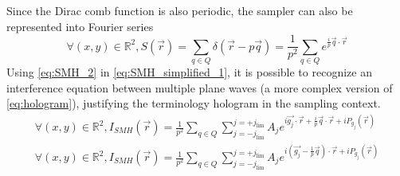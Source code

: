 \documentclass[12pt]{article}
\begin{document}
Since the Dirac comb function is also periodic, the sampler can also be represented into Fourier series
\begin{equation}
\forall (x,y) \in \mathbb{R}^{2}, S(\vec{r})=\sum_{q\in Q}\delta(\vec{r}-p\vec{q}) = \frac{1}{p^2}\sum_{q\in Q}e^{\frac{i}{p}\vec{q}\cdot\vec{r}}
\label{eq:SMH_2}
\end{equation}
Using \cref{eq:SMH_2} in \cref{eq:SMH_simplified_1}, it is possible to recognize an interference equation between multiple plane waves (a more complex version of \cref{eq:hologram}), justifying the terminology hologram in the sampling context.
\begin{equation}
\begin{gathered}
\forall (x,y) \in \mathbb{R}^{2}, I_{\mathit{SMH}}(\vec{r})=\frac{1}{p^2}\sum_{q\in Q}\sum_{j=-j_{\text{lim}}}^{j=+j_{\text{lim}}}A_je^{i\vec{g_j}\cdot\vec{r}+\frac{i}{p}\vec{q}\cdot\vec{r}+iP_{g_{j}}(\vec{r})} \\
\forall (x,y) \in \mathbb{R}^{2}, I_{\mathit{SMH}}(\vec{r})=\frac{1}{p^2}\sum_{q\in Q}\sum_{j=-j_{\text{lim}}}^{j=+j_{\text{lim}}}A_je^{i(\vec{g_j}-\frac{1}{p}\vec{q})\cdot\vec{r}+iP_{g_{j}}(\vec{r})}
\end{gathered}
\label{eq:SMH_3}
\end{equation}
\end{document}
